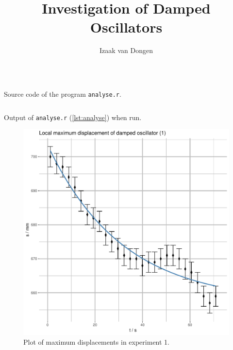 \documentclass[a4paper,11pt]{article}
\title{Investigation of Damped Oscillators}
\author{Izaak van Dongen}
\newenvironment{longlisting}
{\addvspace{\baselineskip}\captionsetup{type=listing}}
{\addvspace{\baselineskip}}
\begin{document}
    \maketitle%

\begin{longlisting}
\inputminted{R}{analyse.r}
\caption{Source code of the program \texttt{analyse.r}.}
\label{lst:analyse}
\end{longlisting}

\begin{longlisting}
\inputminted{text}{analysis_output.txt}
\caption{Output of \texttt{analyse.r} (\ref{lst:analyse}) when run.}
\label{lst:results}
\end{longlisting}

\begin{figure}[H]
\begin{center}
\includegraphics[height=0.45\textheight,page=1]{Rplots.pdf}
\end{center}
\caption{Plot of maximum displacements in experiment 1.}
\label{fig:ex1}
\end{figure}
\end{document}

